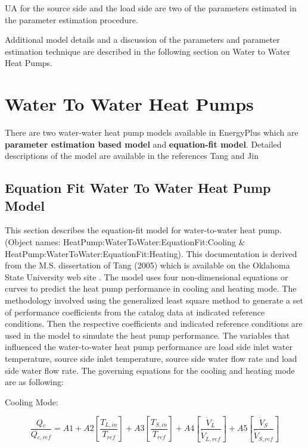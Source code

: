 UA for the source side and the load side are two of the parameters estimated in the parameter estimation procedure.

Additional model details and a discussion of the parameters and parameter estimation technique are described in the following section on Water to Water Heat Pumps.

\section{Water To Water Heat Pumps}\label{water-to-water-heat-pumps}

There are two water-water heat pump models available in EnergyPlus which are \textbf{parameter estimation based model} and \textbf{equation-fit model}. Detailed descriptions of the model are available in the references Tang and Jin

\subsection{Equation Fit Water To Water Heat Pump Model}\label{equation-fit-water-to-water-heat-pump-model}

This section describes the equation-fit model for water-to-water heat pump. (Object names: HeatPump:WaterToWater:EquationFit:Cooling \& HeatPump:WaterToWater:EquationFit:Heating). This documentation is derived from the M.S. dissertation of Tang (2005) which is available on the Oklahoma State University web site . The model uses four non-dimensional equations or curves to predict the heat pump performance in cooling and heating mode. The methodology involved using the generalized least square method to generate a set of performance coefficients from the catalog data at indicated reference conditions. Then the respective coefficients and indicated reference conditions are used in the model to simulate the heat pump performance. The variables that influenced the water-to-water heat pump performance are load side inlet water temperature, source side inlet temperature, source side water flow rate and load side water flow rate. The governing equations for the cooling and heating mode are as following:

Cooling Mode:

\begin{equation}
\frac{{Q{}_c}}{{Q{}_{c,ref}}} = A1 + A2\left[ {\frac{{T{}_{L,in}}}{{T{}_{ref}}}} \right] + A3\left[ {\frac{{T{}_{S,in}}}{{T{}_{ref}}}} \right] + A4\left[ {\frac{{{{\dot V}_L}}}{{{{\dot V}_{L,ref}}}}} \right] + A5\left[ {\frac{{{{\dot V}_S}}}{{{{\dot V}_{S,ref}}}}} \right]
\end{equation}

